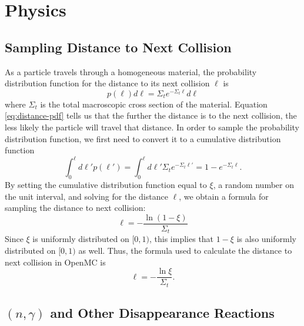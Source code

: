 \section{Physics}

\subsection{Sampling Distance to Next Collision}

As a particle travels through a homogeneous material, the probability
distribution function for the distance to its next collision $\ell$ is
\begin{equation}
  \label{eq:distance-pdf}
  p(\ell) d\ell = \Sigma_t e^{-\Sigma_t \ell} d\ell
\end{equation}
where $\Sigma_t$ is the total macroscopic cross section of the
material. Equation \eqref{eq:distance-pdf} tells us that the further the
distance is to the next collision, the less likely the particle will travel that
distance. In order to sample the probability distribution function, we first
need to convert it to a cumulative distribution function
\begin{equation}
  \label{eq:distance-cdf}
  \int_0^{\ell} d\ell' p(\ell') = \int_0^{\ell} d\ell' \Sigma_t e^{-\Sigma_t
    \ell'} = 1 - e^{-\Sigma_t \ell}.
\end{equation}
By setting the cumulative distribution function equal to $\xi$, a random number
on the unit interval, and solving for the distance $\ell$, we obtain a formula
for sampling the distance to next collision:
\begin{equation}
  \label{eq:sample-distance-1}
  \ell = -\frac{\ln (1 - \xi)}{\Sigma_t}
\end{equation}
Since $\xi$ is uniformly distributed on $[0,1)$, this implies that $1 - \xi$ is
  also uniformly distributed on $[0,1)$ as well. Thus, the formula used to
    calculate the distance to next collision in OpenMC is
\begin{equation}
  \label{eq:sample-distance-2}
  \ell = -\frac{\ln \xi}{\Sigma_t}.
\end{equation}

\subsection{\texorpdfstring{$(n,\gamma)$}{(n,gamma)} and Other Disappearance Reactions}

